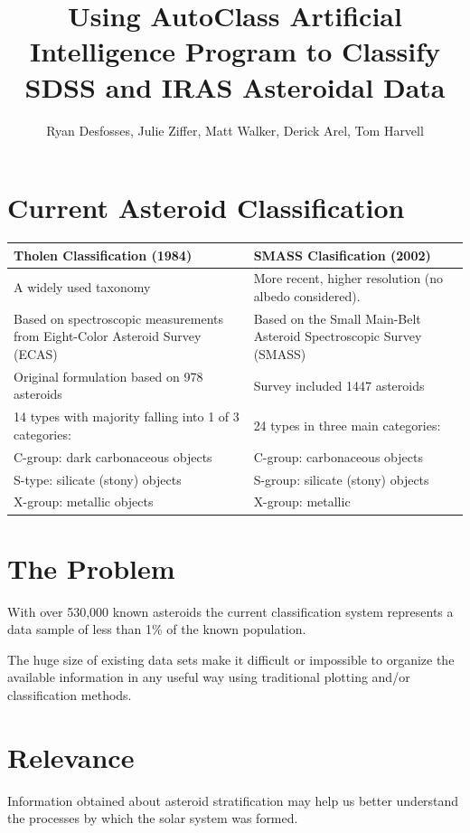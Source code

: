 \documentclass[thesis]{RyanPoster}
\author{Ryan Desfosses, Julie Ziffer, Matt Walker, Derick Arel, Tom Harvell}
\title{Using AutoClass Artificial Intelligence Program to Classify SDSS and IRAS Asteroidal Data}
\begin{document}
\begin{poster}

\section{Current Asteroid Classification}

\begin{center}
\begin{tabular}{ | p{23cm} | p{23cm} | }
\hline
\large{\bf Tholen Classification (1984)} & \large{\bf SMASS Clasification (2002)} \\ \hline\hline
A widely used taxonomy & More recent, higher resolution (no albedo considered).  \\ \hline
Based on spectroscopic measurements from Eight-Color Asteroid Survey (ECAS) & Based on the Small Main-Belt Asteroid Spectroscopic Survey (SMASS) \\ \hline
Original formulation based on 978 asteroids & Survey included 1447 asteroids \\ \hline
14 types with majority falling into 1 of 3 categories: & 24 types in three main categories: \\
\hspace{15} C-group: dark carbonaceous objects & \hspace{15} C-group: carbonaceous objects \\
\hspace{15} S-type: silicate (stony) objects & \hspace{15} S-group: silicate (stony) objects \\
\hspace{15} X-group: metallic objects & \hspace{15} X-group: metallic \\
\hline
\end{tabular}
\end{center}

\section{The Problem}%
With over 530,000 known asteroids the current classification system represents a data sample of less than 1\% of the known population.

The huge size of existing data sets make it difficult or impossible to organize the available information in any useful way using traditional plotting and/or classification methods.

\section{Relevance}
Information obtained about asteroid stratification may help us better understand the processes by which the solar system was formed.  


\end{poster}
\end{document}
